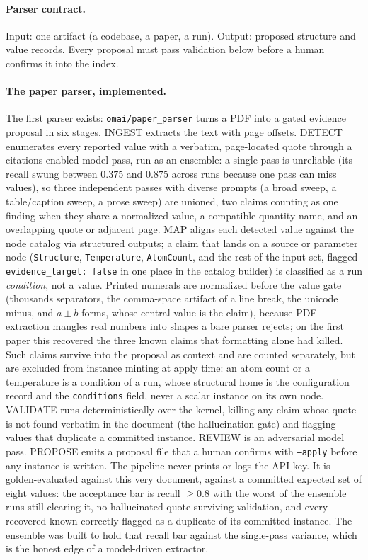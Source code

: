 \documentclass[11pt,a4paper]{article}
\begin{document}
\paragraph{Parser contract.} Input: one artifact (a codebase, a paper, a run). Output:
proposed structure and value records. Every proposal must pass validation below
before a human confirms it into the index.

\paragraph{The paper parser, implemented.} The first parser exists:
\texttt{omai/paper\_parser} turns a PDF into a gated evidence proposal in six
stages. INGEST extracts the text with page offsets. DETECT enumerates every
reported value with a verbatim, page-located quote through a citations-enabled
model pass, run as an ensemble: a single pass is unreliable (its recall swung
between $0.375$ and $0.875$ across runs because one pass can miss values), so
three independent passes with diverse prompts (a broad sweep, a table/caption
sweep, a prose sweep) are unioned, two claims counting as one finding when they
share a normalized value, a compatible quantity name, and an overlapping quote or
adjacent page. MAP aligns each detected value against the node catalog via
structured outputs; a claim that lands on a source or parameter node
(\texttt{Structure}, \texttt{Temperature}, \texttt{AtomCount}, and the rest of
the input set, flagged \texttt{evidence\_target: false} in one place in the
catalog builder) is classified as a run \emph{condition}, not a value. Printed
numerals are normalized before the value gate (thousands separators, the
comma-space artifact of a line break, the unicode minus, and $a \pm b$ forms,
whose central value is the claim), because PDF extraction mangles real numbers
into shapes a bare parser rejects; on the first paper this recovered the three
known claims that formatting alone had killed. Such
claims survive into the proposal as context and are counted separately, but are
excluded from instance minting at apply time: an atom count or a temperature is a
condition of a run, whose structural home is the configuration record and the
\texttt{conditions} field, never a scalar instance on its own node. VALIDATE runs deterministically over the kernel, killing any
claim whose quote is not found verbatim in the document (the hallucination gate)
and flagging values that duplicate a committed instance. REVIEW is an adversarial
model pass. PROPOSE emits a proposal file that a human confirms with
\texttt{--apply} before any instance is written. The pipeline never prints or logs
the API key. It is golden-evaluated against this very document, against a
committed expected set of eight values: the acceptance bar is recall $\ge 0.8$
with the worst of the ensemble runs still clearing it, no hallucinated quote
surviving validation, and every recovered known correctly flagged as a duplicate
of its committed instance. The ensemble was built to hold that recall bar against
the single-pass variance, which is the honest edge of a model-driven extractor.
\end{document}
